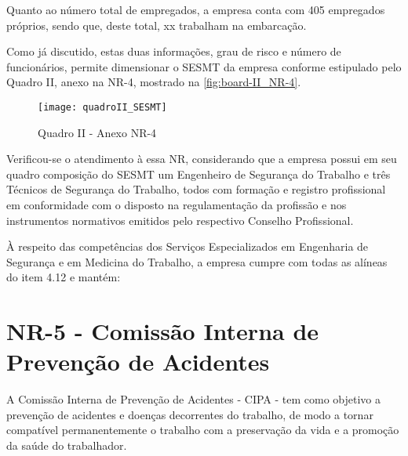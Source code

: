 \documentclass[../main.tex]{subfiles}
\begin{document}
 Quanto ao número total de empregados, a empresa conta com 405 empregados próprios, sendo que, deste total, xx trabalham na embarcação.%
 
 Como já discutido, estas duas informações, grau de risco e número de funcionários, permite dimensionar o SESMT da empresa conforme estipulado pelo Quadro II, anexo na NR-4, mostrado na \autoref{fig:board-II_NR-4}.
 
 \begin{figure}[H]
  \texttt{[image: quadroII\_SESMT]}  
  \caption{Quadro II - Anexo NR-4}  
  \label{fig:board-II_NR-4}
 \end{figure}
 
 Verificou-se o atendimento à essa NR, considerando que a empresa possui em seu quadro composição do SESMT um Engenheiro de Segurança do Trabalho e três Técnicos de Segurança do Trabalho, todos com formação e registro profissional em conformidade com o disposto na regulamentação da profissão e nos instrumentos normativos emitidos pelo respectivo Conselho Profissional. %
 
 
 À respeito das competências dos Serviços Especializados em Engenharia de Segurança e em Medicina do Trabalho, a empresa cumpre com todas as alíneas do item 4.12 e mantém:
 
 \section{NR-5 - Comissão Interna de Prevenção de Acidentes}
 A Comissão Interna de Prevenção de Acidentes - CIPA - tem como objetivo a prevenção de acidentes e doenças decorrentes do trabalho, de modo a tornar compatível permanentemente o trabalho com a preservação da vida e a promoção da saúde do trabalhador.
 
 
\end{document}

